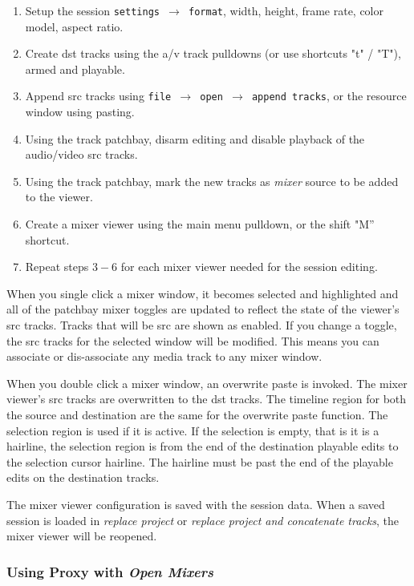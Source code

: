 \begin{enumerate}
    \item Setup the session \texttt{settings $\rightarrow$ format}, width, height, frame rate, color model, aspect ratio.
    \item Create dst tracks using the a/v track pulldowns (or use shortcuts "t" / "T"),  armed and playable.
    \item Append src tracks using \texttt{file $\rightarrow$ open $\rightarrow$ append tracks}, or the resource window using pasting.
    \item Using the track patchbay, disarm editing and disable playback of the audio/video src tracks.
    \item Using the track patchbay, mark the new tracks as \textit{mixer} source to be added to the viewer.
    \item Create a mixer viewer using the main menu pulldown, or the shift "M” shortcut.
    \item Repeat steps $3-6$ for each mixer viewer needed for the session editing.
\end{enumerate}

When you single click a mixer window, it becomes selected and highlighted and all of the patchbay mixer toggles are updated to reflect the state of the viewer’s src tracks.  Tracks that will be src are shown as enabled.  If you change a toggle, the src tracks for the selected window will be modified.  This means you can associate or dis-associate any media track to any mixer window.

When you double click a mixer window, an overwrite paste is invoked.  The mixer viewer’s src tracks are overwritten to the dst tracks.  The timeline region for both the source and destination are the same for the overwrite paste function.  The selection region is used if it is active.  If the selection is empty, that is it is a hairline, the selection region is from the end of the destination playable edits to the selection cursor hairline.  The hairline must be past the end of the playable edits on the destination tracks.

The mixer viewer configuration is saved with the session data.  When a saved session is loaded in \textit{replace project} or \textit{replace project and concatenate tracks}, the mixer viewer will be reopened.

\subsubsection*{Using Proxy with \textit{Open Mixers}}%
\label{ssub:using_proxy_open_mixers}


